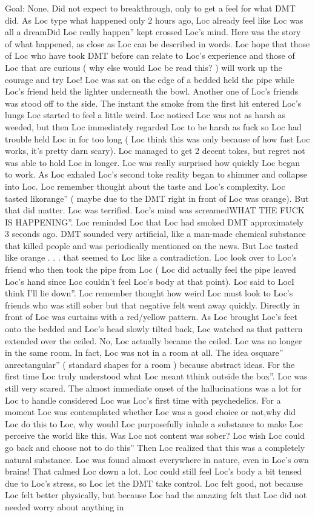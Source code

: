 \documentclass[12pt]{book}
\begin{document}
Goal: None. Did not expect to breakthrough, only to get a feel for what DMT did. As Loc type what happened only 2 hours ago, Loc already feel like Loc was all a dreamDid Loc really happen'' kept crossed Loc's mind. Here was the story of what happened, as close as Loc can be described in words. Loc hope that those of Loc who have took DMT before can relate to Loc's experience and those of Loc that are curious ( why else would Loc be read this? ) will work up the courage and try Loc! Loc was sat on the edge of a bedded held the pipe while Loc's friend held the lighter underneath the bowl. Another one of Loc's friends was stood off to the side. The instant the smoke from the first hit entered Loc's lungs Loc started to feel a little weird. Loc noticed Loc was not as harsh as weeded, but then Loc immediately regarded Loc to be harsh as fuck so Loc had trouble held Loc in for too long ( Loc think this was only because of how fast Loc works, it's pretty darn scary). Loc managed to get 2 decent tokes, but regret not was able to hold Loc in longer. Loc was really surprised how quickly Loc began to work. As Loc exhaled Loc's second toke reality began to shimmer and collapse into Loc. Loc remember thought about the taste and Loc's complexity. Loc tasted likorange'' ( maybe due to the DMT right in front of Loc was orange). But that did matter. Loc was terrified. Loc's mind was screamedWHAT THE FUCK IS HAPPENING''. Loc reminded Loc that Loc had smoked DMT approximately 3 seconds ago. DMT sounded very artificial, like a man-made chemical substance that killed people and was periodically mentioned on the news. But Loc tasted like orange . . . that seemed to Loc like a contradiction. Loc look over to Loc's friend who then took the pipe from Loc ( Loc did actually feel the pipe leaved Loc's hand since Loc couldn't feel Loc's body at that point). Loc said to LocI think I'll lie down''. Loc remember thought how weird Loc must look to Loc's friends who was still sober but that negative felt went away quickly. Directly in front of Loc was curtains with a red/yellow pattern. As Loc brought Loc's feet onto the bedded and Loc's head slowly tilted back, Loc watched as that pattern extended over the ceiled. No, Loc actually became the ceiled. Loc was no longer in the same room. In fact, Loc was not in a room at all. The idea osquare'' anrectangular'' ( standard shapes for a room ) because abstract ideas. For the first time Loc truly understood what Loc meant tthink outside the box''. Loc was still very scared. The almost immediate onset of the hallucinations was a lot for Loc to handle considered Loc was Loc's first time with psychedelics. For a moment Loc was contemplated whether Loc was a good choice or not,why did Loc do this to Loc, why would Loc purposefully inhale a substance to make Loc perceive the world like this. Was Loc not content was sober? Loc wish Loc could go back and choose not to do this'' Then Loc realized that this was a completely natural substance. Loc was found almost everywhere in nature, even in Loc's own brains! That calmed Loc down a lot. Loc could still feel Loc's body a bit tensed due to Loc's stress, so Loc let the DMT take control. Loc felt good, not because Loc felt better physically, but because Loc had the amazing felt that Loc did not needed worry about anything in 
\end{document}
